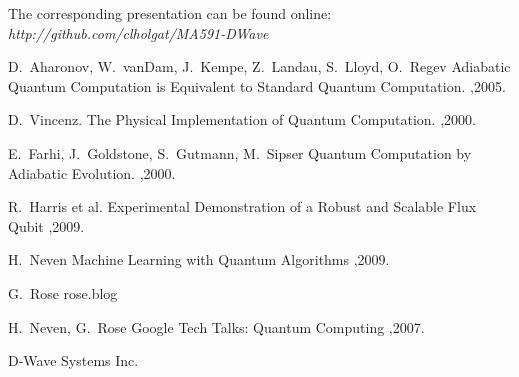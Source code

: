 \documentclass[10pt]{article}
\begin{document}
\bigskip 
The corresponding presentation can be found online: {\em http://github.com/clholgat/MA591-DWave }


  \begin{thebibliography}{10}
 
    D.~Aharonov, W.~vanDam, J.~Kempe, Z.~Landau, S.~Lloyd, O.~Regev
    \newblock Adiabatic Quantum Computation is Equivalent to Standard Quantum Computation.
    ,2005.
  
    D.~Vincenz.
    \newblock The Physical Implementation of Quantum Computation.
    ,2000.

    E.~Farhi, J.~Goldstone, S.~Gutmann, M.~Sipser
    \newblock Quantum Computation by Adiabatic Evolution.
    ,2000.

    R.~Harris et al.
    \newblock Experimental Demonstration of a Robust and Scalable Flux Qubit
    ,2009.

    H.~Neven
    \newblock Machine Learning with Quantum Algorithms
    ,2009.

    G.~Rose
    \newblock rose.blog

    H.~Neven, G.~Rose
    \newblock Google Tech Talks: Quantum Computing
    ,2007.

    \newblock D-Wave Systems Inc.


  \end{thebibliography}
\end{document}
